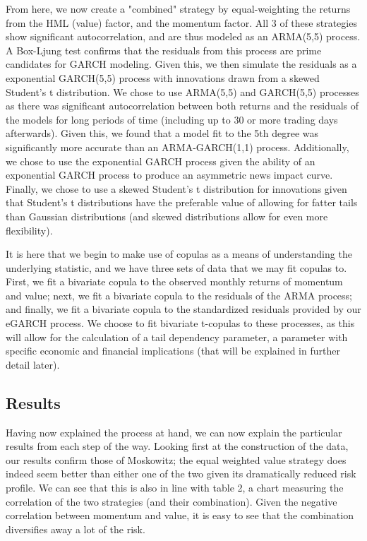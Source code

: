 \documentclass[11pt,letterpaper]{memoir}
\begin{document}
From here, we now create a "combined" strategy by equal-weighting the returns from the HML (value) factor, and the momentum factor. All 3 of these strategies show significant autocorrelation, and are thus modeled as an ARMA(5,5) process. A Box-Ljung test confirms that the residuals from this process are prime candidates for GARCH modeling. Given this, we then simulate the residuals as a exponential GARCH(5,5) process with innovations drawn from a skewed Student's t distribution. We chose to use ARMA(5,5) and GARCH(5,5) processes as there was significant autocorrelation between both returns and the residuals of the models for long periods of time (including up to 30 or more trading days afterwards). Given this, we found that a model fit to the 5th degree was significantly more accurate than an ARMA-GARCH(1,1) process. Additionally, we chose to use the exponential GARCH process given the ability of an exponential GARCH process to produce an asymmetric news impact curve. Finally, we chose to use a skewed Student's t distribution for innovations given that Student's t distributions have the preferable value of allowing for fatter tails than Gaussian distributions (and skewed distributions allow for even more flexibility).

It is here that we begin to make use of copulas as a means of understanding the underlying statistic, and we have three sets of data that we may fit copulas to. First, we fit a bivariate copula to the observed monthly returns of momentum and value; next, we fit a bivariate copula to the residuals of the ARMA process; and finally, we fit a bivariate copula to the standardized residuals provided by our eGARCH process. We choose to fit bivariate t-copulas to these processes, as this will allow for the calculation of a tail dependency parameter, a parameter with specific economic and financial implications (that will be explained in further detail later).

\subsection*{Results}
Having now explained the process at hand, we can now explain the particular results from each step of the way. Looking first at the construction of the data, our results confirm those of Moskowitz; the equal weighted value strategy does indeed seem better than either one of the two given its dramatically reduced risk profile. We can see that this is also in line with table 2, a chart measuring the correlation of the two strategies (and their combination). Given the negative correlation between momentum and value, it is easy to see that the combination diversifies away a lot of the risk.
\end{document}
